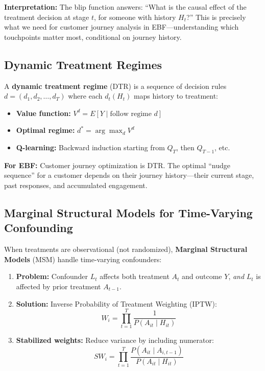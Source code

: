 \textbf{Interpretation:} The blip function answers: ``What is the causal effect of
the treatment decision at stage $t$, for someone with history $H_t$?'' This is
precisely what we need for customer journey analysis in EBF---understanding which
touchpoints matter most, conditional on journey history.

\subsection{Dynamic Treatment Regimes}

A \textbf{dynamic treatment regime} (DTR) \citep{murphy2003optimal} is a sequence
of decision rules $d = (d_1, d_2, \ldots, d_T)$ where each $d_t(H_t)$ maps history
to treatment:

\begin{itemize}
\item \textbf{Value function:} $V^d = E[Y \mid \text{follow regime } d]$
\item \textbf{Optimal regime:} $d^* = \arg\max_d V^d$
\item \textbf{Q-learning:} Backward induction starting from $Q_T$, then $Q_{T-1}$, etc.
\end{itemize}

\textbf{For EBF:} Customer journey optimization is DTR. The optimal ``nudge sequence''
for a customer depends on their journey history---their current stage, past responses,
and accumulated engagement.

\subsection{Marginal Structural Models for Time-Varying Confounding}

When treatments are observational (not randomized), \textbf{Marginal Structural Models}
(MSM) \citep{robins2000msm} handle time-varying confounders:

\begin{enumerate}
\item \textbf{Problem:} Confounder $L_t$ affects both treatment $A_t$ and outcome $Y$,
\emph{and} $L_t$ is affected by prior treatment $A_{t-1}$.

\item \textbf{Solution:} Inverse Probability of Treatment Weighting (IPTW):
\[
W_i = \prod_{t=1}^{T} \frac{1}{P(A_{it} \mid H_{it})}
\]

\item \textbf{Stabilized weights:} Reduce variance by including numerator:
\[
SW_i = \prod_{t=1}^{T} \frac{P(A_{it} \mid A_{i,t-1})}{P(A_{it} \mid H_{it})}
\]
\end{enumerate}

